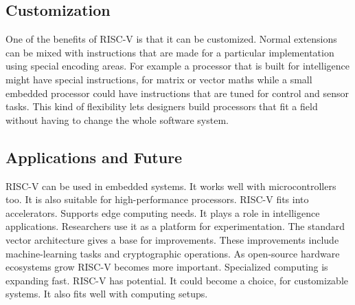 \subsection{Customization}
One of the benefits of RISC‑V is that it can be customized. Normal extensions can be mixed with instructions 
that are made for a particular implementation using special encoding areas. For example a processor that 
is built for intelligence might have special instructions, for matrix or vector maths while a small embedded 
processor could have instructions that are tuned for control and sensor tasks. This kind of flexibility lets 
designers build processors that fit a field without having to change the whole software system.

\subsection{Applications and Future}
RISC-V can be used in embedded systems. It works well with microcontrollers too. It is also suitable for 
high-performance processors. RISC-V fits into accelerators. Supports edge computing needs. It plays a role 
in intelligence applications. Researchers use it as a platform for experimentation. The standard vector 
architecture gives a base for improvements. These improvements include machine-learning tasks and cryptographic 
operations. As open-source hardware ecosystems grow RISC-V becomes more important. Specialized computing is 
expanding fast. RISC-V has potential. It could become a choice, for customizable systems. It also fits well 
with computing setups.